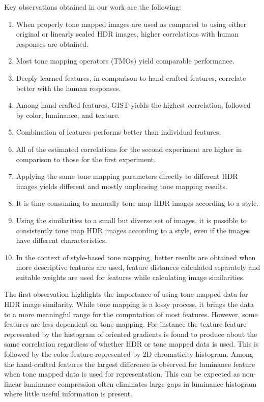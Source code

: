 Key observations obtained in our work are the following:
%
\begin{enumerate}
\item When properly tone mapped images are used as compared to using either original or linearly scaled HDR images, higher correlations with human responses are obtained.
\item Most tone mapping operators (TMOs) yield comparable performance.
\item Deeply learned features, in comparison to hand-crafted features, correlate better with the human responses.
\item Among hand-crafted features, GIST yields the highest correlation, followed by color, luminance, and texture.
\item Combination of features performs better than individual features.
\item All of the estimated correlations for the second experiment are higher in comparison to those for the first experiment.
\item Applying the same tone mapping parameters directly to different HDR images yields different and mostly unpleasing tone mapping results.
\item It is time consuming to manually tone map HDR images according to a style.
\item Using the similarities to a small but diverse set of images, it is possible to consistently tone map HDR images according to a style, even if the images have different characteristics.
\item In the context of style-based tone mapping, better results are obtained when more descriptive features are used, feature distances calculated separately and suitable weights are used for features while calculating image similarities.
\end{enumerate}

The first observation highlights the importance of using tone mapped data for HDR image similarity. While tone mapping is a lossy process, it brings the data to a more meaningful range for the computation of most features. However, some features are less dependent on tone mapping. For instance the texture feature represented by the histogram of oriented gradients is found to produce about the same correlation regardless of whether HDR or tone mapped data is used. This is followed by the color feature represented by 2D chromaticity histogram. Among the hand-crafted features the largest difference is  observed for luminance feature when tone mapped data is used for representation. This can be expected as non-linear luminance compression often eliminates large gaps in luminance histogram where little useful information is present.

